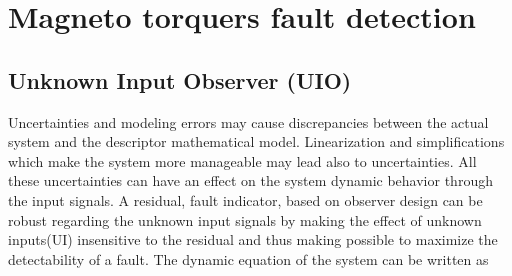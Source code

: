 \section{Magneto torquers  fault detection}
\subsection{Unknown Input Observer (UIO)} \label{sec:UIO}
Uncertainties and modeling errors may cause discrepancies between the actual system and the descriptor mathematical model. Linearization and simplifications which make the system more manageable may lead also to uncertainties. All these uncertainties can have an effect on the system dynamic behavior through the input signals.   
A residual, fault indicator, based on observer design can be robust regarding the unknown input signals by making the effect of unknown inputs(UI) insensitive to the residual and thus making possible to maximize the detectability of a fault. The dynamic equation of the system can be written as 
%

